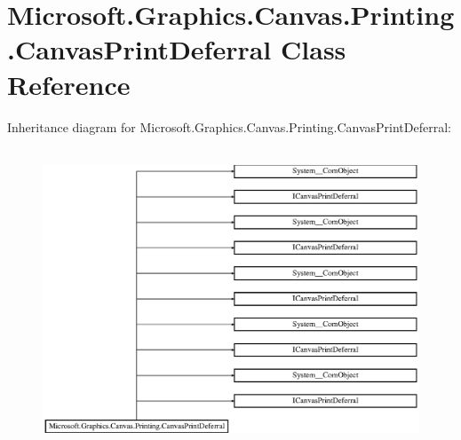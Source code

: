 \hypertarget{class_microsoft_1_1_graphics_1_1_canvas_1_1_printing_1_1_canvas_print_deferral}{}\section{Microsoft.\+Graphics.\+Canvas.\+Printing.\+Canvas\+Print\+Deferral Class Reference}
\label{class_microsoft_1_1_graphics_1_1_canvas_1_1_printing_1_1_canvas_print_deferral}
Inheritance diagram for Microsoft.\+Graphics.\+Canvas.\+Printing.\+Canvas\+Print\+Deferral\+:\begin{figure}[H]
\begin{center}
\leavevmode
\includegraphics[height=9.005848cm]{class_microsoft_1_1_graphics_1_1_canvas_1_1_printing_1_1_canvas_print_deferral}
\end{center}
\end{figure}
